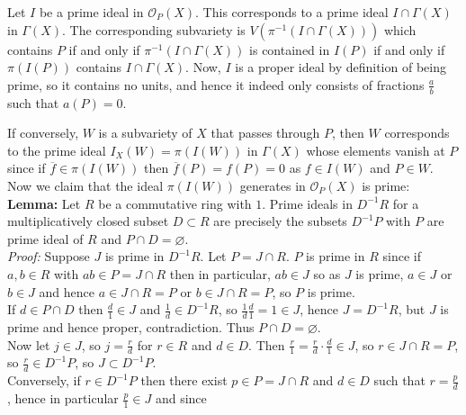 \documentclass[a4paper]{article}
\begin{document}
Let $I$ be a prime ideal in $\mathcal{O}_P(X)$. This corresponds
to a prime ideal $I \cap \Gamma(X)$ in $\Gamma(X)$. The corresponding
subvariety is $V\left( \pi^{-1}\left( I \cap \Gamma(X) \right)  \right) $ which
contains $P$ if and only if $\pi^{-1}\left( I \cap \Gamma(X) \right) $ is
contained in $I(P)$ if and only if
$\pi\left( I(P) \right) $ contains $I \cap \Gamma(X)$. Now, $I$ is
a proper ideal by definition of being prime, so it contains no units, and hence it indeed only consists
of fractions $\frac{a}{b}$ such that $a(P) = 0$.\\
\linebreak

If conversely, $W$ is a subvariety of $X$ that passes through $P$, then
$W$ corresponds to the prime ideal $I_X(W) = \pi \left( I(W) \right) $ 
in $\Gamma(X)$ whose elements vanish at $P$ since
if $\overline{f} \in \pi\left( I(W) \right) $ then
$\overline{f}(P) = f(P) = 0$ as $f \in I(W)$ and $P \in W$.
 Now we claim that the ideal $\pi\left( I(W) \right) $ generates in
 $\mathcal{O}_P (X)$ is prime:\\
 \linebreak
 \textbf{Lemma:} Let $R$ be a commutative ring with $1$. Prime ideals in 
 $D^{-1}R$ for a multiplicatively closed subset $D \subset R$ are precisely 
 the subsets $D^{-1}P$ with $P$ are prime ideal of $R$ and $P \cap
 D = \varnothing$.\\
 \linebreak
 \textit{Proof:} Suppose $J$ is prime in $D^{-1}R$. Let $P = J\cap R$.
 $P$ is prime in $R$ since if $a,b \in R$ with $ab \in P = J \cap R$ then
 in particular, $ab \in J$ so as $J$ is prime, $a \in J$ or $b \in J$ and hence
 $a \in J \cap R = P$ or $b \in J \cap R = P$, so $P$ is prime.\\
 If $d \in P \cap D$ then $\frac{d}{1} \in J$ and $\frac{1}{d} \in D^{-1}R$, so
 $\frac{1}{d} \frac{d}{1} = 1 \in J$, hence $J = D^{-1}R$, but $J$ is prime
 and hence proper, contradiction. Thus $P \cap D = \varnothing$.\\
 \linebreak
Now let $j \in J$, so $j = \frac{r}{d}$ for $r \in R$ and $d \in D$. Then
$\frac{r}{1} = \frac{r}{d} \cdot \frac{d}{1} \in J$, so $r \in J \cap R = P$,
so
$\frac{r}{d} \in D^{-1}P$, so $J \subset D^{-1}P$.\\
\linebreak
Conversely, if $r \in D^{-1}P$ then there exist $p \in P = J \cap R$ and $d \in D$ such
that
$r = \frac{p}{d}$, hence in particular $\frac{p}{1} \in J$ and since 
\end{document}
